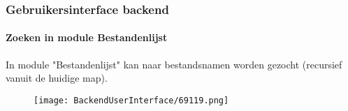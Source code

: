 \begin{frame}[fragile]
	\frametitle{Gebruikersinterface backend}
	\framesubtitle{Zoeken in module Bestandenlijst}

	In module "Bestandenlijst" kan naar bestandsnamen worden gezocht (recursief
	vanuit de huidige map).

	\begin{figure}
		\texttt{[image: BackendUserInterface/69119.png]}
	\end{figure}

\end{frame}

